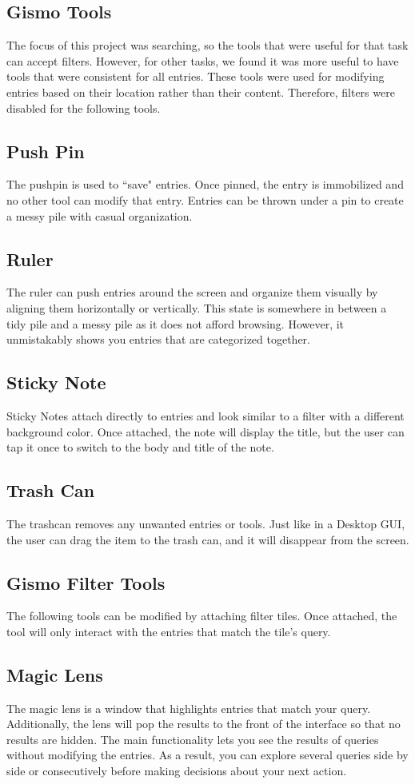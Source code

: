 \documentclass{article}
\begin{document}
\subsection{Gismo Tools}
The focus of this project was searching, so the tools that were useful for that task can accept filters. However, for other tasks, we found it was more useful to have tools that were consistent for all entries.  These tools were used for modifying entries based on their location rather than their content.  Therefore, filters were disabled for the following tools.
\subsection*{Push Pin}
The pushpin is used to ``save" entries.  Once pinned, the entry is immobilized and no other tool can modify that entry.  Entries can be thrown under a pin to create a messy pile with casual organization.  
\subsection*{Ruler}
The ruler can push entries around the screen and organize them visually by aligning them horizontally or vertically.  This state is somewhere in between a tidy pile and a messy pile \cite{Agarawala2006} as it does not afford browsing.  However, it unmistakably shows you entries that are categorized together.  
\subsection*{Sticky Note}
Sticky Notes attach directly to entries and look similar to a filter with a different background color.  Once attached, the note will display the title, but the user can tap it once to switch to the body and title of the note.
\subsection*{Trash Can}
The trashcan removes any unwanted entries or tools.  Just like in a Desktop GUI, the user can drag the item to the trash can, and it will disappear from the screen.  
\subsection{Gismo Filter Tools}
The following tools can be modified by attaching filter tiles.  Once attached, the tool will only interact with the entries that match the tile's query.  
\subsection*{Magic Lens}
The magic lens is a window that highlights entries that match your query.  Additionally, the lens will pop the results to the front of the interface so that no results are hidden.  The main functionality lets you see the results of queries without modifying the entries.  As a result, you can explore several queries side by side or consecutively before making decisions about your next action.    
\end{document}
